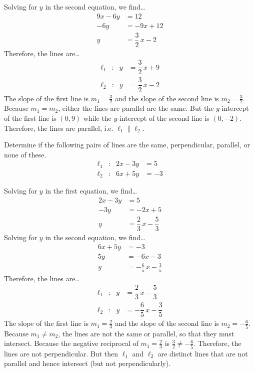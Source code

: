 \documentclass[11pt,letterpaper]{article}
\begin{document}
\sol Solving for $y$ in the second equation, we find\dots
	\[
	\begin{aligned}
	9x - 6y&= 12 \\[0.3cm]
	-6y&= -9x + 12 \\[0.3cm]
	y&= \dfrac{3}{2}\,x - 2
	\end{aligned}
	\] 
Therefore, the lines are\dots
	\[
	\begin{aligned}
	\ell_1&: & y&= \dfrac{3}{2}\,x + 9 \\
	\ell_2&: & y&= \dfrac{3}{2}\,x - 2
	\end{aligned}
	\]
The slope of the first line is $m_1= \frac{3}{2}$ and the slope of the second line is $m_2= \frac{3}{2}$. Because $m_1= m_2$, either the lines are parallel are the same. But the $y$-intercept of the first line is $(0, 9)$ while the $y$-intercept of the second line is $(0, -2)$. Therefore, the lines are parallel, i.e. $\ell_1 \parallel \ell_2$. 



\newpage



 Determine if the following pairs of lines are the same, perpendicular, parallel, or none of these. 
	\[
	\begin{aligned}
	\ell_1&: & 2x - 3y&= 5 \\
	\ell_2&: & 6x + 5y&= -3
	\end{aligned}
	\] \pspace

\sol Solving for $y$ in the first equation, we find\dots
	\[
	\begin{aligned}
	2x - 3y&= 5 \\[0.3cm]
	-3y&= -2x + 5 \\[0.3cm]
	y&= \dfrac{2}{3}\,x - \dfrac{5}{3}
	\end{aligned}
	\]
Solving for $y$ in the second equation, we find\dots
	\[
	\begin{aligned}
	6x + 5y&= -3 \\[0.3cm]
	5y&= -6x - 3 \\[0.3cm]
	y&= -\frac{6}{5}\,x - \frac{3}{5}
	\end{aligned}
	\] 
Therefore, the lines are\dots
	\[
	\begin{aligned}
	\ell_1&: & y&= \dfrac{2}{3}\,x - \dfrac{5}{3} \\
	\ell_2&: & y&= -\dfrac{6}{5}\,x - \dfrac{3}{5}
	\end{aligned}
	\]
The slope of the first line is $m_1= \frac{2}{3}$ and the slope of the second line is $m_2= -\frac{6}{5}$. Because $m_1 \neq m_2$, the lines are not the same or parallel, so that they must intersect. Because the negative reciprocal of $m_1= \frac{2}{3}$ is $\frac{3}{2} \neq -\frac{6}{5}$. Therefore, the lines are not perpendicular. But then $\ell_1$ and $\ell_2$ are distinct lines that are not parallel and hence intersect (but not perpendicularly). 
\end{document}
